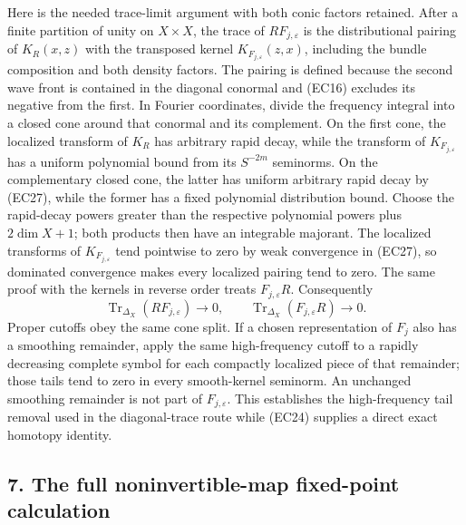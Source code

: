 \documentclass[
  11pt,
]{article}
\begin{document}
Here is the needed trace-limit argument with both conic factors
retained. After a finite partition of unity on \(X\times X\), the trace
of \(R F_{j,\varepsilon}\) is the distributional pairing of \(K_R(x,z)\)
with the transposed kernel \(K_{F_{j,\varepsilon}}(z,x)\), including the
bundle composition and both density factors. The pairing is defined
because the second wave front is contained in the diagonal conormal and
(EC16) excludes its negative from the first. In Fourier coordinates,
divide the frequency integral into a closed cone around that conormal
and its complement. On the first cone, the localized transform of
\(K_R\) has arbitrary rapid decay, while the transform of
\(K_{F_{j,\varepsilon}}\) has a uniform polynomial bound from its
\(S^{-2m}\) seminorms. On the complementary closed cone, the latter has
uniform arbitrary rapid decay by (EC27), while the former has a fixed
polynomial distribution bound. Choose the rapid-decay powers greater
than the respective polynomial powers plus \(2\dim X+1\); both products
then have an integrable majorant. The localized transforms of
\(K_{F_{j,\varepsilon}}\) tend pointwise to zero by weak convergence in
(EC27), so dominated convergence makes every localized pairing tend to
zero. The same proof with the kernels in reverse order treats
\(F_{j,\varepsilon}R\). Consequently \[
 \operatorname{Tr}_{\Delta_X}(R F_{j,\varepsilon})
       \longrightarrow0,\qquad
 \operatorname{Tr}_{\Delta_X}(F_{j,\varepsilon} R)
       \longrightarrow0.
 \tag{EC29}
\] Proper cutoffs obey the same cone split. If a chosen representation
of \(F_j\) also has a smoothing remainder, apply the same high-frequency
cutoff to a rapidly decreasing complete symbol for each compactly
localized piece of that remainder; those tails tend to zero in every
smooth-kernel seminorm. An unchanged smoothing remainder is not part of
\(F_{j,\varepsilon}\). This establishes the high-frequency tail removal
used in the diagonal-trace route while (EC24) supplies a direct exact
homotopy identity.

\subsection{7. The full noninvertible-map fixed-point
calculation}\label{the-full-noninvertible-map-fixed-point-calculation}
\end{document}
